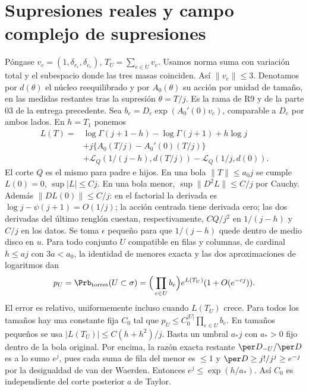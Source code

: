 \section{Supresiones reales y campo complejo de supresiones}
Póngase $v_e=(1,\delta_{r_e},\delta_{c_e})$, $T_U=\sum_{e\in U}v_e$.
Usamos norma suma con variación total y el subespacio donde las tres masas coinciden.
Así $\|v_e\|\le3$. Denotamos por $d(\theta)$ el núcleo reequilibrado y por $A_0(\theta)$
su acción por unidad de tamaño, en las medidas restantes tras la supresión $\theta=T/j$.
Es la rama de R9 y de la parte 03 de la entrega precedente. Sea
$b_e=D_e\exp(A_0'(0)v_e)$, comparable a $D_e$ por ambos lados. En $h=T_1$ ponemos
\begin{align*}
 L(T)={}&\log\Gamma(j+1-h)-\log\Gamma(j+1)+h\log j\\
 &+j\{A_0(T/j)-A_0'(0)(T/j)\}\\
 &+\mathcal L_Q(1/(j-h),d(T/j))-\mathcal L_Q(1/j,d(0)).
\end{align*}
El corte $Q$ es el mismo para padre e hijos. En una bola $\|T\|\le a_0 j$ se cumple
$L(0)=0$, $\sup|L|\le Cj$. En una bola menor, $\sup\|D^2L\|\le C/j$ por Cauchy.
Además $\|DL(0)\|\le C/j$: en el factorial la derivada es $\log j-\psi(j+1)=O(1/j)$;
la acción centrada tiene derivada cero; las dos derivadas del último renglón cuestan,
respectivamente, $C Q/j^2$ en $1/(j-h)$ y $C/j$ en los datos. Se toma
$\epsilon$ pequeño para que $1/(j-h)$ quede dentro de medio disco en $u$.
Para todo conjunto $U$ compatible en filas y columnas, de cardinal $h\le aj$ con $3a<a_0$,
la identidad de menores exacta y las dos aproximaciones de logaritmos dan
\[
 p_U=\Prb_{\rm torres}(U\subset\sigma)
     =\Big(\prod_{e\in U}b_e\Big)e^{L(T_U)}(1+O(e^{-cj})).
\]
El error es relativo, uniformemente incluso cuando $L(T_U)$ crece.
Para todos los tamaños hay una constante fija $C_0$ tal que
$p_U\le C_0^{|U|}\prod_{e\in U}b_e$.
En tamaños pequeños se usa $|L(T_U)|\le C(h+h^2)/j$. Basta un umbral $a_*j$
con $a_*>0$ fijo dentro de la bola original. Por encima, la razón exacta restante
$\per D_{-U}/\per D$ es a lo sumo $e^j$, pues cada suma de fila del menor es $\le1$
y $\per D\ge j!/j^j\ge e^{-j}$ por la desigualdad de van der Waerden. Entonces
$e^j\le \exp(h/a_*)$. Así $C_0$ es independiente del corte posterior $a$ de Taylor.
